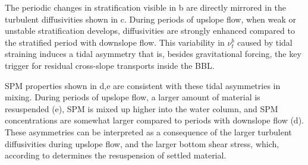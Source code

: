 The periodic changes in stratification visible in b
are directly mirrored in the turbulent diffusivities shown in
c. During periods of upslope flow, when weak or
unstable stratification develops, diffusivities are strongly enhanced
compared to the stratified period with downslope flow. This
variability in $\nu_t^b$ caused by tidal straining induces a tidal
asymmetry that is, besides gravitational forcing, the key trigger for
residual cross-slope transports inside the BBL.

SPM properties shown in d,e are consistent with
these tidal asymmetries in mixing. During periods of upslope flow, a
larger amount of material is resuspended (e), SPM is
mixed up higher into the water column, and SPM concentrations are
somewhat larger compared to periods with downslope flow
(d). These asymmetries can be interpreted as a
consequence of the larger turbulent diffusivities during upslope flow,
and the larger bottom shear stress, which, according to 
determines the resuspension of settled material.


